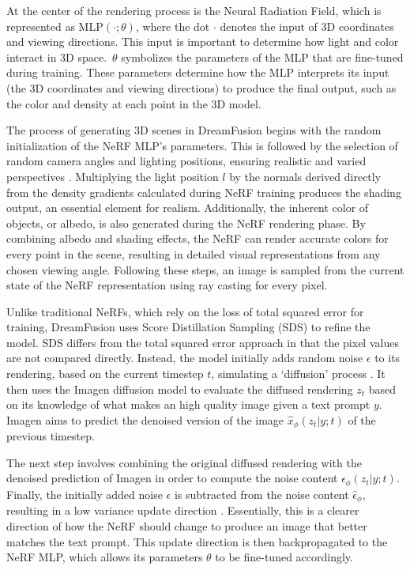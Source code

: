 At the center of the rendering process is the Neural Radiation Field, which is represented as \( \text{MLP}(\cdot; \theta) \), where the dot \(\cdot\) denotes the input of 3D coordinates and viewing directions. This input is important to determine how light and color interact in 3D space.~\(\theta\) symbolizes the parameters of the MLP that are fine-tuned during training. These parameters determine how the MLP interprets its input (the 3D coordinates and viewing directions) to produce the final output, such as the color and density at each point in the 3D model.

The process of generating 3D scenes in DreamFusion begins with the random initialization of the NeRF MLP's parameters. This is followed by the selection of random camera angles and lighting positions, ensuring realistic and varied perspectives \citep{pooleDreamfusion}. Multiplying the light position \( l \) by the normals derived directly from the density gradients calculated during NeRF training produces the shading output, an essential element for realism. Additionally, the inherent color of objects, or albedo, is also generated during the NeRF rendering phase. By combining albedo and shading effects, the NeRF can render accurate colors for every point in the scene, resulting in detailed visual representations from any chosen viewing angle. Following these steps, an image is sampled from the current state of the NeRF representation using ray casting for every pixel.

Unlike traditional NeRFs, which rely on the loss of total squared error for training, DreamFusion uses Score Distillation Sampling (SDS) to refine the model. SDS differs from the total squared error approach in that the pixel values are not compared directly. Instead, the model initially adds random noise \(\epsilon\) to its rendering, based on the current timestep \(t\),  simulating a `diffusion' process \citep{pooleDreamfusion}. It then uses the Imagen diffusion model to evaluate the diffused rendering \(z_t\) based on its knowledge of what makes an high quality image given a text prompt \(y\). Imagen aims to predict the denoised version of the image \(\hat{x}_\phi(z_t | y; t)\) of the previous timestep. 

The next step involves combining the original diffused rendering with the denoised prediction of Imagen in order to compute the noise content \( \hat{\epsilon}_\phi(z_t | y; t) \). Finally, the initially added noise \(\epsilon\) is subtracted from the noise content \(\hat{\epsilon}_\phi\), resulting in a low variance update direction \citep{pooleDreamfusion}. Essentially, this is a clearer direction of how the NeRF should change to produce an image that better matches the text prompt. This update direction is then backpropagated to the NeRF MLP, which allows its parameters \(\theta\) to be fine-tuned accordingly.

